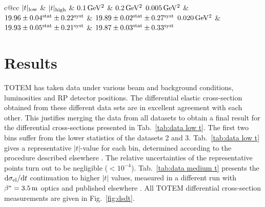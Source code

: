 \documentclass[doublecol]{epl/epl2}
\def\d{{\rm d}}
\def\un#1{\,{\rm #1}}
\begin{document}
\def\TB{%
\begin{table}
\hbox{}\vskip-4mm
\caption{Elastic slopes $B$ (in $\rm GeV^{-2}$) obtained from parameterization Eq.~(\ref{eq:extrapolation}) fitted through intervals $|t|_{\rm low}$ to $|t|_{\rm high}$.
}
\label{tab:B}
\small
\begin{center}
\vskip-3mm
\setlength{\tabcolsep}{3pt}
\begin{tabular}{c@{\hskip15pt}cc}\hline
$|t|_{\rm low}$ & \multispan2\hfil $|t|_{\rm high}$\hfil\cr
& $0.1\un{GeV^2}$ & $0.2\un{GeV^2}$\cr\hline
$0.005\un{GeV^2}$ & $19.96 \pm 0.04^{\rm stat} \pm 0.22^{\rm syst}$ & $19.89 \pm 0.02^{\rm stat} \pm 0.27^{\rm syst}$ \cr
$0.020\un{GeV^2}$ & $19.93 \pm 0.05^{\rm stat} \pm 0.21^{\rm syst}$ & $19.87 \pm 0.03^{\rm stat} \pm 0.33^{\rm syst}$\cr\hline
\end{tabular}
\end{center}
\end{table}
}


\TI
\TII
\TB
\TR

\section{Results}

TOTEM has taken data under various beam and background conditions, luminosities and RP detector positions. The differential elastic cross-section obtained from these different data sets  are in excellent agreement with each other. This justifies merging the data from all datasets to obtain a final result for the differential cross-sections presented in Tab.~\ref{tab:data low t}. The first two bins suffer from the lower statistics of the datasets 2 and 3. Tab.~\ref{tab:data low t} gives a representative $|t|$-value for each bin, determined according to the procedure described elsewhere \cite{lafferty94}. The relative uncertainties of the representative points turn out to be negligible ($< 10^{-4}$). Tab.~\ref{tab:data medium t} presents the $\d\sigma_{\rm el}/\d t$ continuation to higher $|t|$ values, measured in a different run with $\beta^* = 3.5\un{m}$ optics and published elsewhere \cite{epl95}. All TOTEM differential cross-section measurements are given in Fig.~\ref{fig:dsdt}.
\end{document}
